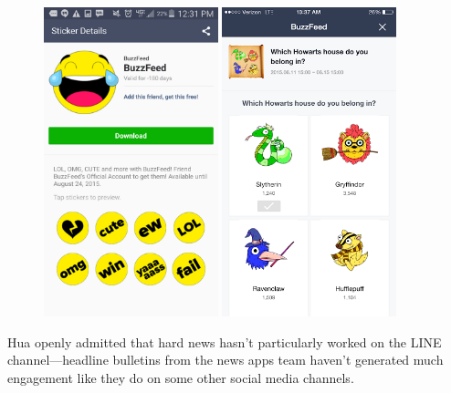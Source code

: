 \documentclass[notoc, symmetric, nobib, nols]{towcenter-guideto-book}
\begin{document}
\begin{figure}
\begin{center}
\includegraphics[width=0.45\textwidth]{graphics/CHATAPPS_Page15_BF2.png}
\includegraphics[width=0.45\textwidth]{graphics/CHATAPPS_Page15_BF3.png}
\end{center}
\end{figure}

Hua openly admitted that hard news hasn't particularly worked on the LINE channel---headline bulletins from the news apps team haven't generated much engagement like they do on some other social media channels.
\end{document}
